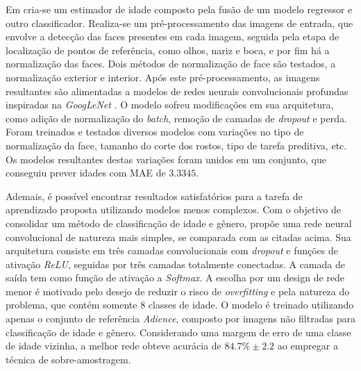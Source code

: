 Em \cite{liu2015agenet} cria-se um estimador de idade composto pela fusão de um modelo regressor e outro classificador. Realiza-se um pré-processamento das imagens de entrada, que envolve a detecção das faces presentes em cada imagem, seguida pela etapa de localização de pontos de referência, como olhos, nariz e boca, e por fim há a normalização das faces. Dois métodos de normalização de face são testados, a normalização exterior e interior. Após este pré-processamento, as imagens resultantes são alimentadas a modelos de redes neurais convolucionais profundas inspiradas na \emph{GoogLeNet} \cite{inception}. O modelo sofreu modificações em sua arquitetura, como adição de normalização do \emph{batch}, remoção de camadas de \emph{dropout} e perda. Foram treinados e testados diversos modelos com variações no tipo de normalização da face, tamanho do corte dos rostos, tipo de tarefa preditiva, etc. Os modelos resultantes destas variações foram unidos em um conjunto, que conseguiu prever idades com MAE de $3.3345$.

Ademais, é possível encontrar resultados satisfatórios para a tarefa de aprendizado proposta utilizando modelos menos complexos. Com o objetivo de consolidar um método de classificação de idade e gênero, \cite{levi2015age} propõe uma rede neural convolucional de natureza mais simples, se comparada com as citadas acima. Sua arquitetura consiste em três camadas convolucionais com \emph{dropout} e funções de ativação \emph{ReLU}, seguidas por três camadas totalmente conectadas. A camada de saída tem como função de ativação a  \emph{Softmax}. A escolha por um design de rede menor é motivado pelo desejo de reduzir o risco de \emph{overfitting} e pela natureza do problema, que contém somente 8 classes de idade. O modelo é treinado utilizando apenas o conjunto de referência \emph{Adience}, composto por imagens não filtradas para classificação de idade e gênero. Considerando uma margem de erro de uma classe de idade vizinha, a melhor rede obteve acurácia de $84.7\% \pm 2.2$ ao empregar a técnica de sobre-amostragem.
